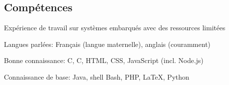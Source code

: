 \documentclass[11pt,a4paper]{article}
\newenvironment{indentsection}[1]%
{\begin{list}{}%
	{\setlength{\leftmargin}{#1}}%
	\item[]%
}
{\end{list}}
\newcommand{\Cplusplus}
{C\nolinebreak[4]\hspace{-.05em}\raisebox{.22ex}{\footnotesize\bf ++}}
\begin{document}
\subsection*{Compétences}

\begin{indentsection}{\parindent}
\begin{description*}
	\item[Expérience de travail sur systèmes embarqués avec des ressources limitées]
	\item[Langues parlées:]
	Français (langue maternelle), anglais (couramment)
	\item[Bonne connaissance:]
	C, \Cplusplus, HTML, CSS, JavaScript (incl. Node.js)
	\item[Connaissance de base:]
	Java, shell Bash, PHP, \LaTeX, Python
\end{description*}
\end{indentsection}
\end{document}

